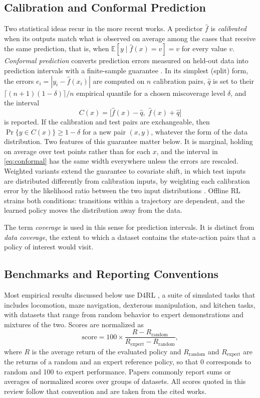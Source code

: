 \documentclass[conference]{IEEEtran}
\begin{document}
\subsection{Calibration and Conformal Prediction}
Two statistical ideas recur in the more recent works. A predictor $\hat{f}$ is \emph{calibrated} when its outputs match what is observed on average among the cases that receive the same prediction, that is, when $\mathbb{E}[y \mid \hat{f}(x) = v] = v$ for every value $v$. \emph{Conformal prediction} converts prediction errors measured on held-out data into prediction intervals with a finite-sample guarantee \cite{angelopoulos2023conformal}. In its simplest (split) form, the errors $e_i = |y_i - \hat{f}(x_i)|$ are computed on $n$ calibration pairs, $\hat{q}$ is set to their $\lceil (n+1)(1-\delta) \rceil / n$ empirical quantile for a chosen miscoverage level $\delta$, and the interval
\begin{equation}
C(x) = \big[\hat{f}(x) - \hat{q},\; \hat{f}(x) + \hat{q}\big]
\label{eq:conformal}
\end{equation}
is reported. If the calibration and test pairs are exchangeable, then $\Pr\{y \in C(x)\} \geq 1 - \delta$ for a new pair $(x,y)$, whatever the form of the data distribution. Two features of this guarantee matter below. It is marginal, holding on average over test points rather than for each $x$, and the interval in \eqref{eq:conformal} has the same width everywhere unless the errors are rescaled. Weighted variants extend the guarantee to covariate shift, in which test inputs are distributed differently from calibration inputs, by weighting each calibration error by the likelihood ratio between the two input distributions \cite{tibshirani2019covariate}. Offline RL strains both conditions: transitions within a trajectory are dependent, and the learned policy moves the distribution away from the data.

The term \emph{coverage} is used in this sense for prediction intervals. It is distinct from \emph{data coverage}, the extent to which a dataset contains the state-action pairs that a policy of interest would visit.

\subsection{Benchmarks and Reporting Conventions}
Most empirical results discussed below use D4RL \cite{fu2020d4rl}, a suite of simulated tasks that includes locomotion, maze navigation, dexterous manipulation, and kitchen tasks, with datasets that range from random behavior to expert demonstrations and mixtures of the two. Scores are normalized as
\begin{equation}
\text{score} = 100 \times \frac{R - R_{\mathrm{random}}}{R_{\mathrm{expert}} - R_{\mathrm{random}}},
\label{eq:score}
\end{equation}
where $R$ is the average return of the evaluated policy and $R_{\mathrm{random}}$ and $R_{\mathrm{expert}}$ are the returns of a random and an expert reference policy, so that 0 corresponds to random and 100 to expert performance. Papers commonly report sums or averages of normalized scores over groups of datasets. All scores quoted in this review follow that convention and are taken from the cited works.
\end{document}
